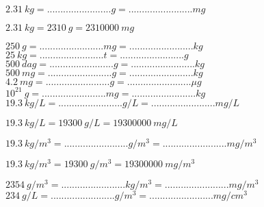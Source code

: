 \begin{questions}
		\question $\num{2.31}\  kg =........................g =........................mg $\\
		\begin{solution}
			$\num{2.31}\  kg = \num{2310}\  g = \num{2310000}\  mg $
		\end{solution}
	
		\question $ \num{250}\  g =........................mg =........................kg $\\
		
		
		\question $ \num{25}\  kg =........................t =........................ g $\\
		
		
		\question $ \num{500}\  dag =........................g =........................ kg $\\
		
		\question $ \num{500}\  mg =........................g =........................ kg $\\
		
		\question $ \num{4.2}\  mg =........................g =........................ \mu g $\\
		
		\question $ 10^{21}\  g =........................mg =........................ kg $\\		
		
		\question $ \num{19.3}\  kg/L =........................g/L =........................mg/L $\\
		\begin{solution}
			$ \num{19.3}\  kg/L = \num{19300}\  g/L = \num{19300000}\  mg/L $
		\end{solution}
		
		\question $\num{19.3}\  kg/m^3 =........................g/m^3 =........................mg/m^3 $\\
		\begin{solution}
			$ \num{19.3}\  kg/m^3 = \num{19300} \  g/m^3 = \num{19300000} \  mg/m^3 $
		\end{solution}
		
		
		\question $\num{2354}\  g/m^3 =........................kg/m^3 =........................mg/m^3 $\\
		
		\question $ \num{234}\  g/L =........................g/m^3 =........................mg/cm^3 $\\	
\end{questions}
